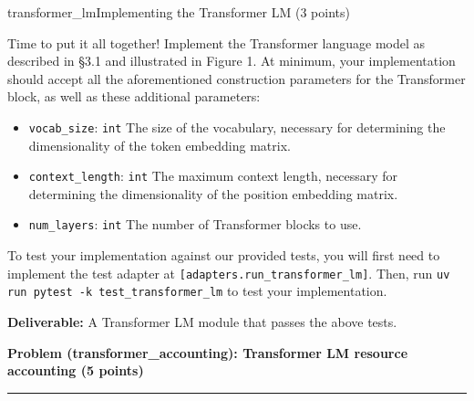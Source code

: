 \begin{problembox}{transformer\_lm}{Implementing the Transformer LM  (3 points)}

    Time to put it all together! Implement the Transformer language model as described in \S 3.1 and illustrated in Figure 1. At minimum, your implementation should accept all the aforementioned construction parameters for the Transformer block, as well as these additional parameters:

    \begin{itemize}[label={}, leftmargin=1.5em, itemsep=0.5em, parsep=0pt, topsep=0.5em]
        \item \texttt{vocab\_size}: \textcolor{green!50!black}{\texttt{int}} The size of the vocabulary, necessary for determining the dimensionality of the token embedding matrix.
        \item \texttt{context\_length}: \textcolor{green!50!black}{\texttt{int}} The maximum context length, necessary for determining the dimensionality of the position embedding matrix.
        \item \texttt{num\_layers}: \textcolor{green!50!black}{\texttt{int}} The number of Transformer blocks to use.
    \end{itemize}

    \vspace{0.5em}
    To test your implementation against our provided tests, you will first need to implement the test adapter at \textcolor{red!80!black}{\texttt{[adapters.run\_transformer\_lm]}}. Then, run \texttt{uv run pytest -k test\_transformer\_lm} to test your implementation.

    \textbf{Deliverable:} A Transformer LM module that passes the above tests.

\end{problembox}

\boxseparator

\vspace{1em}
\noindent\textbf{Problem (transformer\_accounting): Transformer LM resource accounting \hfill (5 points)}

\noindent\rule{\textwidth}{0.4pt}

